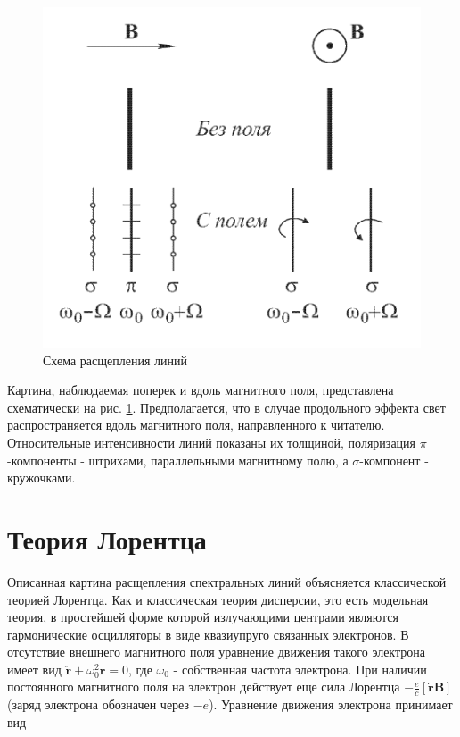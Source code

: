 \documentclass[12pt]{article}
\begin{document}
  \begin{figure}
    \centering
    \includegraphics[]{pole.png}
    \caption{Схема расщепления линий}
    \label{fig:pole}
  \end{figure}

  Картина, наблюдаемая поперек и вдоль магнитного поля, представлена схематически на рис. \ref{fig:pole}. Предполагается, что в случае продольного эффекта свет распространяется вдоль магнитного поля, направленного к читателю. Относительные интенсивности линий показаны их толщиной, поляризация $\pi$-компоненты - штрихами, параллельными магнитному полю, а $\sigma$-компонент - кружочками.

  \section{Теория Лорентца}
  Описанная картина расщепления спектральных линий объясняется классической теорией Лорентца. Как и классическая теория дисперсии, это есть модельная теория, в простейшей форме которой излучающими центрами являются гармонические осцилляторы в виде квазиупруго связанных электронов. В отсутствие внешнего магнитного поля уравнение движения такого электрона имеет вид $\ddot{\mathbf{r}}+\omega_0^2 \mathbf{r}=0$, где $\omega_0$ - собственная частота электрона. При наличии постоянного магнитного поля на электрон действует еще сила Лорентца $-\frac{e}{c}[\dot{\mathbf{r}} \mathbf{B}]$ (заряд электрона обозначен через $-e$). Уравнение движения электрона принимает вид
\end{document}
